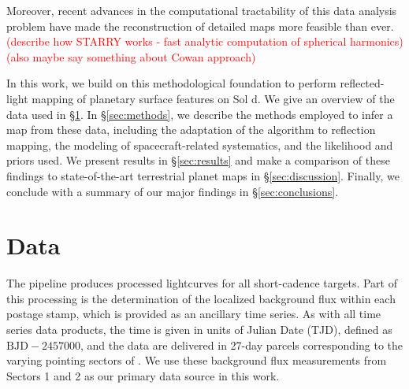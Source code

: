 \documentclass[modern]{aastex62}
\newcommand{\todo}[1]{\textcolor{red}{#1}}
\begin{document}
Moreover, recent advances in the computational tractability of this data analysis problem 
have made the reconstruction of detailed maps more feasible than ever. 
\todo{(describe how STARRY works - fast analytic computation of spherical harmonics)}
\todo{(also maybe say something about Cowan approach)}

In this work, we build on this methodological foundation to perform 
reflected-light mapping of planetary surface features on Sol d. 
We give an overview of the \TESS data used in \S\ref{sec:data}. 
In \S\ref{sec:methods}, we describe the methods employed to infer a map 
from these data, including the adaptation of the \starry algorithm to reflection 
mapping, the modeling of spacecraft-related systematics, and the likelihood and 
priors used. 
We present results in \S\ref{sec:results} and make a comparison of these 
findings to state-of-the-art terrestrial planet maps in 
\S\ref{sec:discussion}. 
Finally, we conclude with a summary of our major findings in \S\ref{sec:conclusions}.

\section{Data}
\label{sec:data}

The \TESS pipeline produces processed lightcurves for all short-cadence targets. 
Part of this processing is the determination of the localized background flux 
within each postage stamp, which is provided as an ancillary time series. 
As with all \TESS time series data products, the time is given in units of \TESS Julian 
Date (TJD), defined as $\mathrm{BJD} - 2457000$, and the data are delivered in 27-day 
parcels corresponding to the varying pointing sectors of \TESS. 
We use these background flux measurements from Sectors 1 and 2 as our primary 
data source in this work. 
\end{document}
